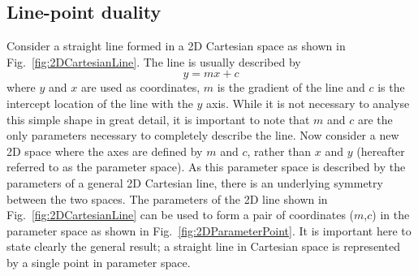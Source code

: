 \subsection{Line-point duality}
\label{subsec:LinePointDuality}
Consider a straight line formed in a 2D Cartesian space as shown in Fig.~\ref{fig:2DCartesianLine}.  The line is usually described by
\begin{equation}
  y = mx + c
  \label{eq:2DLineCartesean}
\end{equation}
where $y$ and $x$ are used as coordinates, $m$ is the gradient of the line and $c$ is the intercept location of the line with the $y$ axis.  While it is not necessary to analyse this simple shape in great detail, it is important to note that $m$ and $c$ are the only parameters necessary to completely describe the line.  
\newline
\newline
Now consider a new 2D space where the axes are defined by $m$ and $c$, rather than $x$ and $y$ (hereafter referred to as the parameter space).  As this parameter space is described by the parameters of a general 2D Cartesian line, there is an underlying symmetry between the two spaces.  The parameters of the 2D line shown in Fig.~\ref{fig:2DCartesianLine} can be used to form a pair of coordinates ($m$,$c$) in the parameter space as shown in Fig.~\ref{fig:2DParameterPoint}.  It is important here to state clearly the general result; a straight line in Cartesian space is represented by a single point in parameter space. 
